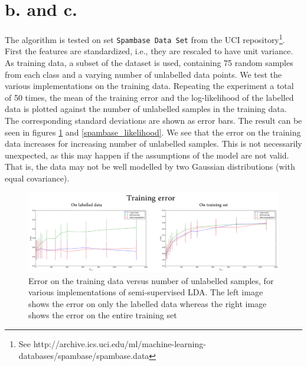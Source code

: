 \documentclass [a4paper] {report}
\begin{document}
	\section*{b. and c.}
	The algorithm is tested on set \texttt{Spambase Data Set} from the UCI repository\footnote{See http://archive.ics.uci.edu/ml/machine-learning-databases/spambase/spambase.data}.
	First the features are standardized, i.e., they are rescaled to have unit variance. As training data, a subset of the dataset is used, containing 75 random samples from each class and a varying number of unlabelled data points. We test the various implementations on the training data. Repeating the experiment a total of 50 times, the mean of the training error and the log-likelihood of the labelled data is plotted against the number of unlabelled samples in the training data. The corresponding standard deviations are shown as error bars. The result can be seen in figures \ref{spambase_error} and \ref{spambase_likelihood}. We see that the error on the training data increases for increasing number of unlabelled samples. This is not necessarily unexpected, as this may happen if the assumptions of the model are not valid. That is, the data may not be well modelled by two Gaussian distributions (with equal covariance).

	\begin{figure}[H]
		\begin{center}
			\includegraphics[scale=0.55]{Images/spambase_train_error_both.png}
			\caption{Error on the training data versus number of unlabelled samples, for various implementations of semi-supervised LDA. The left image shows the error on only the labelled data whereas the right image shows the error on the entire training set}
			\label{spambase_error}
		\end{center}
	\end{figure}
\end{document}
